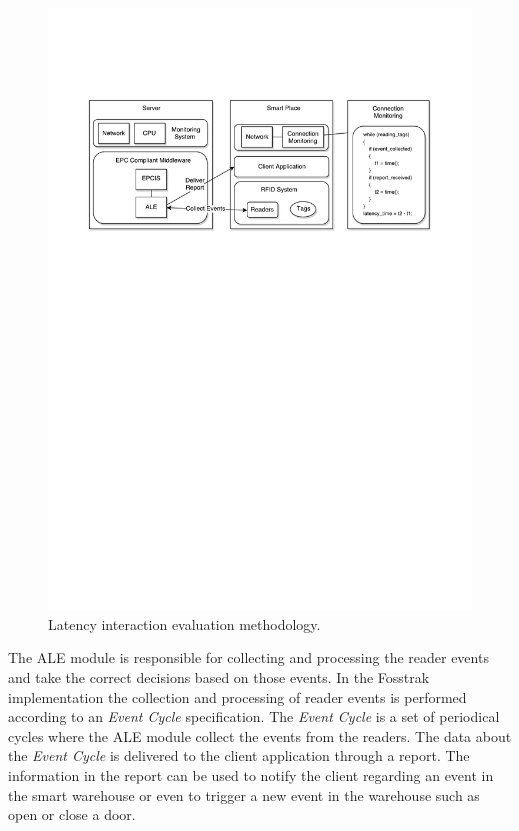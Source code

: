 \begin{figure}[ht!]
  \centering
  \includegraphics[width=.9\textwidth]{./images/eval_latency_methodology}
  \caption{Latency interaction evaluation methodology.}
  \label{fig:eval_latency_methodology}
\end{figure}

The \gls{ALE} module is responsible for collecting and processing the reader events and take the
correct decisions based on those events. In the Fosstrak implementation the collection and processing
of reader events is performed according to an \textit{Event Cycle} specification. The \textit{Event Cycle}
is a set of periodical cycles where the \gls{ALE} module collect the events from the readers. The data
about the \textit{Event Cycle} is delivered to the client application through a report. The information
in the report can be used to notify the client regarding an event in the smart warehouse or even to
trigger a new event in the warehouse such as open or close a door.\\

